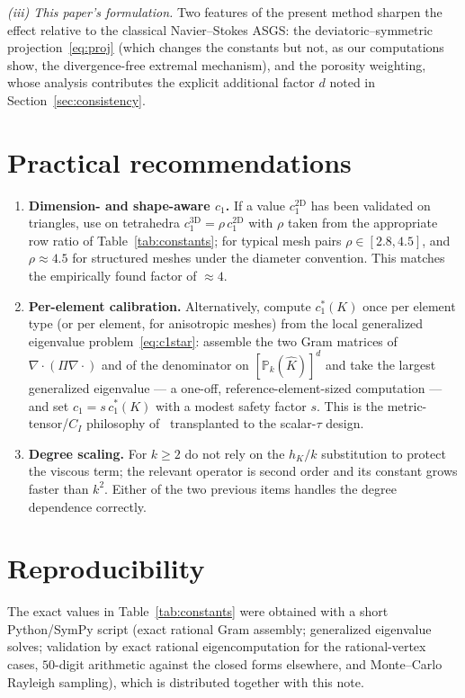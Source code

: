 \documentclass[11pt,a4paper]{article}
\theoremstyle{remark}
\newcommand{\PP}{\mathbb{P}}
\newcommand{\Proj}{\Pi}
\begin{document}
\emph{(iii) This paper's formulation.} Two features of the present
method sharpen the effect relative to the classical Navier--Stokes
ASGS: the deviatoric--symmetric projection~\eqref{eq:proj} (which
changes the constants but not, as our computations show, the
divergence-free extremal mechanism), and the porosity weighting, whose
analysis contributes the explicit additional factor $d$ noted in
Section~\ref{sec:consistency}.

\section{Practical recommendations}
\label{sec:recommendations}

\begin{enumerate}
\item \textbf{Dimension- and shape-aware $c_1$.} If a value
$c_1^{2\mathrm D}$ has been validated on triangles, use on tetrahedra
$c_1^{3\mathrm D} = \rho\, c_1^{2\mathrm D}$ with $\rho$ taken from
the appropriate row ratio of Table~\ref{tab:constants}; for typical
mesh pairs $\rho \in [2.8, 4.5]$, and $\rho \approx 4.5$ for
structured meshes under the diameter convention. This matches the
empirically found factor of $\approx 4$.
\item \textbf{Per-element calibration.} Alternatively, compute
$c_1^*(K)$ once per element type (or per element, for anisotropic
meshes) from the local generalized eigenvalue
problem~\eqref{eq:c1star}: assemble the two Gram matrices of
$\nabla\!\cdot(\Proj\nabla\cdot)$ and of the denominator on
$[\PP_k(\hat K)]^d$ and take the largest generalized eigenvalue --- a
one-off, reference-element-sized computation --- and set $c_1 = s\,
c_1^*(K)$ with a modest safety factor $s$. This is the
metric-tensor/$C_I$ philosophy of~\cite{HarariHughes1992,Bazilevs2007}
transplanted to the scalar-$\tau$ design.
\item \textbf{Degree scaling.} For $k \ge 2$ do not rely on the
$h_K/k$ substitution to protect the viscous term; the relevant
operator is second order and its constant grows faster than $k^2$.
Either of the two previous items handles the degree dependence
correctly.
\end{enumerate}

\section*{Reproducibility}
The exact values in Table~\ref{tab:constants} were obtained with a
short Python/SymPy script (exact rational Gram assembly; generalized
eigenvalue solves; validation by exact rational eigencomputation for
the rational-vertex cases, $50$-digit arithmetic against the closed
forms elsewhere, and Monte--Carlo Rayleigh sampling), which is
distributed together with this note.
\end{document}
